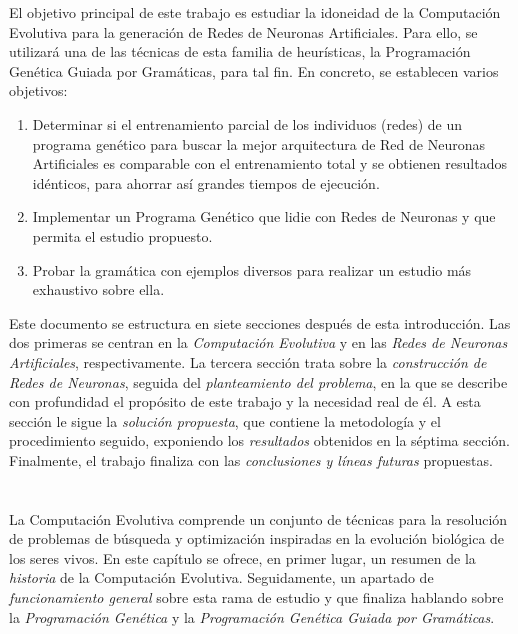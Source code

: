 \documentclass[spanish,a4paper,12pt,twoside]{report}
\begin{document}
  El objetivo principal de este trabajo es estudiar la idoneidad de la Computación Evolutiva para la generación de Redes de Neuronas Artificiales. Para ello, se utilizará una de las técnicas de esta familia de heurísticas, la Programación Genética Guiada por Gramáticas, para tal fin. En concreto, se establecen varios objetivos:
  \begin{enumerate}
    \item Determinar si el entrenamiento parcial de los individuos (redes) de un programa genético para buscar la mejor arquitectura de Red de Neuronas Artificiales es comparable con el entrenamiento total y se obtienen resultados idénticos, para ahorrar así grandes tiempos de ejecución.
    \item Implementar un Programa Genético que lidie con Redes de Neuronas y que permita el estudio propuesto.
    \item Probar la gramática con ejemplos diversos para realizar un estudio más exhaustivo sobre ella.
  \end{enumerate} \par
  Este documento se estructura en siete secciones después de esta introducción. Las dos primeras se centran en la \emph{Computación Evolutiva} y en las \emph{Redes de Neuronas Artificiales}, respectivamente. La tercera sección trata sobre la \emph{construcción de Redes de Neuronas}, seguida del \emph{planteamiento del problema}, en la que se describe con profundidad el propósito de este trabajo y la necesidad real de él. A esta sección le sigue la \emph{solución propuesta}, que contiene la metodología y el procedimiento seguido, exponiendo los \emph{resultados} obtenidos en la séptima sección. Finalmente, el trabajo finaliza con las \emph{conclusiones y líneas futuras} propuestas. \par
  
  \chapter{\vspace{-3cm}{\LARGE 2. Computación Evolutiva}}
  \vspace{-1cm}
  La Computación Evolutiva comprende un conjunto de técnicas para la resolución de problemas de búsqueda y optimización inspiradas en la evolución biológica de los seres vivos. En este capítulo se ofrece, en primer lugar, un resumen de la \emph{historia} de la Computación Evolutiva. Seguidamente, un apartado de \emph{funcionamiento general} sobre esta rama de estudio y que finaliza hablando sobre la \emph{Programación Genética} y la \emph{Programación Genética Guiada por Gramáticas}.
\end{document}

